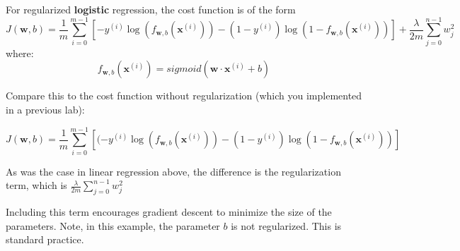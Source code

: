 \documentclass[11pt]{article}
\begin{document}
For regularized \textbf{logistic} regression, the cost function is of
the form
\[J(\mathbf{w},b) = \frac{1}{m}  \sum_{i=0}^{m-1} \left[ -y^{(i)} \log\left(f_{\mathbf{w},b}\left( \mathbf{x}^{(i)} \right) \right) - \left( 1 - y^{(i)}\right) \log \left( 1 - f_{\mathbf{w},b}\left( \mathbf{x}^{(i)} \right) \right) \right] + \frac{\lambda}{2m}  \sum_{j=0}^{n-1} w_j^2 \tag{3}\]
where:
\[ f_{\mathbf{w},b}(\mathbf{x}^{(i)}) = sigmoid(\mathbf{w} \cdot \mathbf{x}^{(i)} + b)  \tag{4} \]

Compare this to the cost function without regularization (which you
implemented in a previous lab):

\[ J(\mathbf{w},b) = \frac{1}{m}\sum_{i=0}^{m-1} \left[ (-y^{(i)} \log\left(f_{\mathbf{w},b}\left( \mathbf{x}^{(i)} \right) \right) - \left( 1 - y^{(i)}\right) \log \left( 1 - f_{\mathbf{w},b}\left( \mathbf{x}^{(i)} \right) \right)\right] \]

As was the case in linear regression above, the difference is the
regularization term, which is {
\(\frac{\lambda}{2m} \sum_{j=0}^{n-1} w_j^2\) }

Including this term encourages gradient descent to minimize the size of
the parameters. Note, in this example, the parameter \(b\) is not
regularized. This is standard practice.
\end{document}
